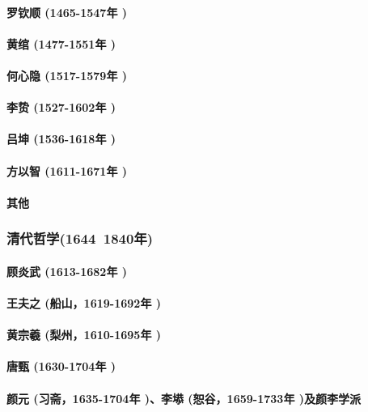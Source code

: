 \documentclass[UTF8]{../RepresentationUniverse}
\begin{document}
        \paragraph{罗钦顺 (1465-1547年 )}
        \paragraph{黄绾 (1477-1551年 )}
        \paragraph{何心隐 (1517-1579年 )}
        \paragraph{李贽 (1527-1602年 )}
        \paragraph{吕坤 (1536-1618年 )}
        \paragraph{方以智 (1611-1671年 )}
        \paragraph{其他}

    \subsubsection{清代哲学(1644~1840年)}
        \paragraph{顾炎武 (1613-1682年 )}
        \paragraph{王夫之 (船山，1619-1692年 )}
        \paragraph{黄宗羲 (梨州，1610-1695年 )}
        \paragraph{唐甄 (1630-1704年 )}
        \paragraph{颜元 (习斋，1635-1704年 )、李塨 (恕谷，1659-1733年 )及颜李学派}
\end{document}
